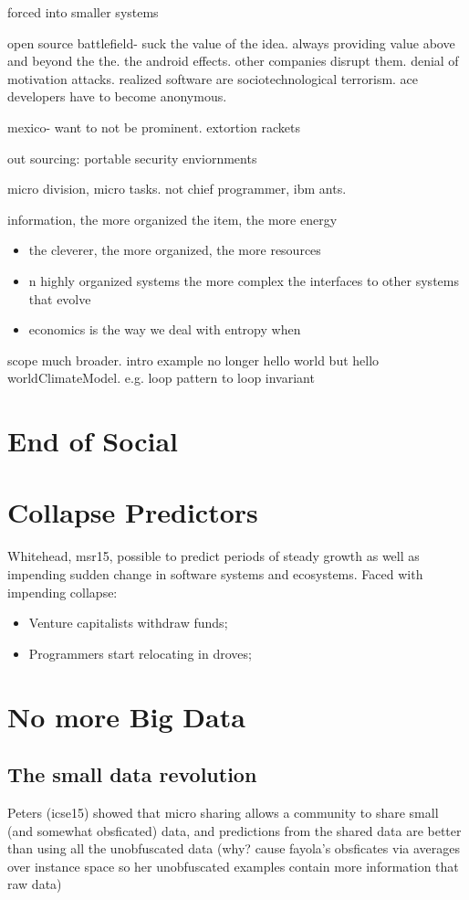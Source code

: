 \documentclass[journal]{IEEEtran}
\newcommand{\bi}{\begin{itemize}}
\newcommand{\ei}{\end{itemize}}
\begin{document}
forced into smaller systems

open source battlefield- suck the value of the idea. always providing value above and beyond
the the. the android effects. other companies disrupt them. denial of motivation attacks. realized software are sociotechnological terrorism. ace developers have to become anonymous.

mexico- want to not be prominent. extortion rackets 

out sourcing: portable security enviornments

micro division, micro tasks. not chief programmer, ibm ants.

information, the more organized the item, the more energy 
\bi
\item the cleverer, the more organized, the more resources
\item n highly organized systems the more complex the interfaces to other systems that evolve
\item economics is the way we deal with entropy when 
\ei

scope much broader. intro example no longer hello world but hello worldClimateModel. e.g. loop pattern to loop invariant

\section{End of Social}


\section{Collapse Predictors}

Whitehead, msr15, possible to predict periods of steady growth
as well as impending sudden change in software systems and
ecosystems. Faced with impending collapse:
\bi
\item Venture capitalists withdraw funds;
\item Programmers start relocating in droves;
\ei
 

\section{No more Big Data}

\subsection{The small data revolution}

Peters (icse15) showed that micro sharing allows a community to share small (and somewhat obsficated) data, and predictions from the shared data are better than using all the unobfuscated data (why? cause fayola's obsficates via   averages over instance space so her 
unobfuscated examples contain more information that raw data)
\end{document}
